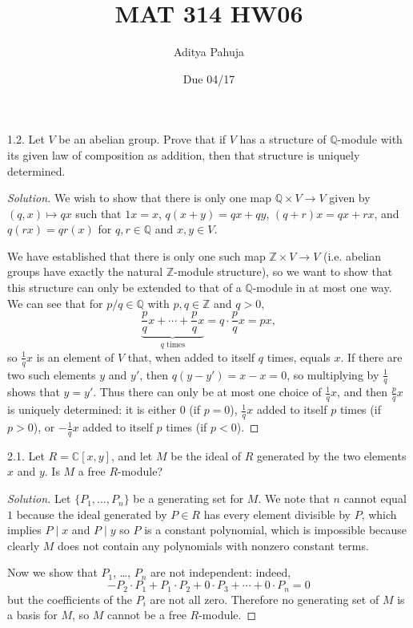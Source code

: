 \documentclass[10pt]{scrartcl}
\title{\vspace{-2em}MAT 314 HW06}
\author{\large Aditya Pahuja}
\date{\large Due 04/17}
\providecommand{\CC}{\mathbb C}
\providecommand{\QQ}{\mathbb Q}
\providecommand{\ZZ}{\mathbb Z}
\newenvironment{soln}{\begin{proof}[Solution]}{\end{proof}}
\begin{document}
\maketitle

\begin{problem*}1.2.
	Let $V$ be an abelian group. Prove that if $V$ has a structure of
	$\QQ$-module with its given law of composition as addition,
	then that structure is uniquely determined.
\end{problem*}

\begin{soln}
	We wish to show that there is only one map $\QQ\times V\to V$
	given by $(q,x)\mapsto qx$ such that $1x = x$, $q(x+y) = qx+qy$,
	$(q+r)x = qx + rx$, and $q(rx) = qr(x)$ for $q,r\in\QQ$ and $x,y\in V$.
	
	We have established that there is only one such map $\ZZ\times V\to V$
	(i.e. abelian groups have exactly the natural $\ZZ$-module structure),
	so we want to show that this structure can only be extended to
	that of a $\QQ$-module in at most one way.
	We can see that for $p/q\in\QQ$ with $p,q\in\ZZ$ and $q>0$,
	\[\underbrace{\frac pqx + \cdots + \frac pqx}_{q\text{ times}}
	= q\cdot\frac pqx = px,\]
	so $\frac1q x$ is an element of $V$ that, when added to itself $q$ times,
	equals $x$. If there are two such elements $y$ and $y'$,
	then $q(y-y') = x-x = 0$, so multiplying by $\frac1q$ shows that $y=y'$.
	Thus there can only be at most one choice of $\frac1qx$,
	and then $\frac pqx$ is uniquely determined: it is
	either $0$ (if $p=0$), $\frac 1qx$ added to itself $p$ times
	(if $p>0$), or $-\frac1qx$ added to itself $p$ times (if $p<0$).
\end{soln}

\begin{problem*}2.1.
	Let $R = \CC[x,y]$, and let $M$ be the ideal of $R$
	generated by the two elements $x$ and $y$.
	Is $M$ a free $R$-module?
\end{problem*}

\begin{soln}
	Let $\{P_1, \dots, P_n\}$ be a generating set for $M$.
	We note that $n$ cannot equal $1$ because the ideal generated by
	$P\in R$ has every element divisible by $P$, which implies
	$P\mid x$ and $P\mid y$ so $P$ is a constant polynomial,
	which is impossible because clearly $M$ does not contain
	any polynomials with nonzero constant terms.
	
	 Now we show that $P_1$, \dots, $P_n$ are not independent: indeed,
	 \[-P_2\cdot P_1 + P_1\cdot P_2
	 + 0\cdot P_3 + \cdots + 0\cdot P_n = 0\]
	 but the coefficients of the $P_i$ are not all zero.
	 Therefore no generating set of $M$ is a basis for $M$,
	 so $M$ cannot be a free $R$-module.
\end{soln}
\end{document}
